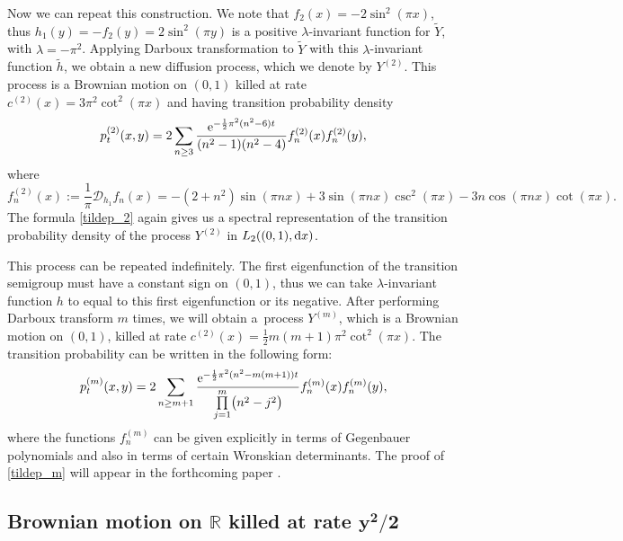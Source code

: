 \documentclass[pdftex]{sigma}
\numberwithin{equation}{section}
\theoremstyle{definition}
\def\r{{\mathbb R}}
\def\d{{\textnormal d}}
\begin{document}
Now we can repeat this construction. We note that $f_2(x)=-2\sin^2(\pi x)$, thus $h_1(y)=-f_2(y)=2\sin^2(\pi y)$ is a positive $\lambda$-invariant function for $\widetilde Y$, with $\lambda=-\pi^2$. Applying Darboux transformation to $\widetilde Y$ with this $\lambda$-invariant function $\tilde h$, we obtain a new diffusion process, which we denote by $Y^{(2)}$. This process is a Brownian motion on $(0,1)$ killed at rate
$c^{(2)}(x)=3\pi^2 \cot^2(\pi x)$ and having transition probability density
\begin{equation}\label{tildep_2}
p^{(2)}_t(x,y)=2\sum\limits_{n\ge 3} \frac{{\rm e}^{-\frac{1}{2} \pi^2 (n^2-6) t} }{(n^2-1)(n^2-4)} f^{(2)}_n(x) f^{(2)}_n(y),
\end{equation}
where
\[
f^{(2)}_n(x):=\frac{1}{\pi} {\mathcal D}_{h_1} f_n(x)=-(2+n^2) \sin(\pi n x) + 3\sin(\pi n x) \csc^2(\pi x) - 3 n \cos(\pi n x)\cot(\pi x).
\]
The formula \eqref{tildep_2} again gives us a spectral representation of the transition probability density of the process $Y^{(2)}$ in $L_2((0,1), \d x)$.

This process can be repeated indefinitely. The first eigenfunction of the transition semigroup must have a constant sign on $(0,1)$, thus we can take $\lambda$-invariant function $h$ to equal to this first eigenfunction or its negative. After performing Darboux transform $m$ times, we will obtain a~process $Y^{(m)}$, which is a Brownian motion on $(0,1)$, killed at rate $c^{(2)}(x)=\frac{1}{2} m(m+1)\pi^2 \cot^2(\pi x)$. The transition probability can be written in the following form:
\begin{equation}\label{tildep_m}
p^{(m)}_t(x,y)=2\sum\limits_{n\ge m+1} \frac{{\rm e}^{-\frac{1}{2} \pi^2 (n^2-m(m+1)) t}}
{\prod\limits_{j=1}^m \bigl(n^2-j^2\bigr)} f^{(m)}_n(x) f^{(m)}_n(y),
\end{equation}
where the functions $f^{(m)}_n$ can be given explicitly in terms of Gegenbauer polynomials and also in terms of certain Wronskian determinants. The proof of \eqref{tildep_m} will appear in the forthcoming paper \cite{Yuan_2024}.

\subsection[Brownian motion on R killed at rate y\^2/2]{Brownian motion on $\boldsymbol{\r}$ killed at rate $\boldsymbol{y^2/2}$}\label{example5}
\end{document}
